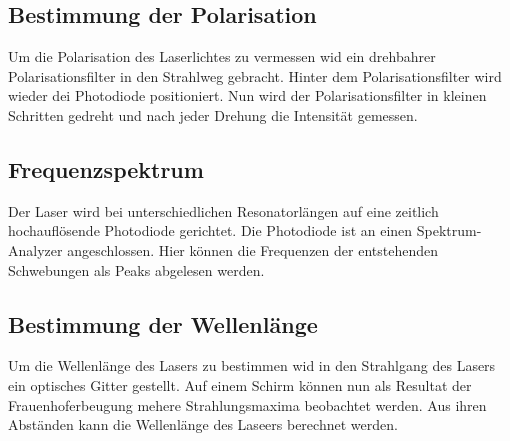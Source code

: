 \subsection{Bestimmung der Polarisation}
\label{sec:polarisation}
Um die Polarisation des Laserlichtes zu vermessen wid ein drehbahrer Polarisationsfilter in den Strahlweg 
gebracht. Hinter dem Polarisationsfilter wird wieder dei Photodiode positioniert. Nun wird der
Polarisationsfilter in kleinen Schritten gedreht und nach jeder Drehung die Intensität gemessen.

\subsection{Frequenzspektrum}
\label{sec:Frequenzspektrum}
Der Laser wird bei unterschiedlichen Resonatorlängen auf eine zeitlich hochauflösende Photodiode gerichtet.
Die Photodiode ist an einen Spektrum-Analyzer angeschlossen. Hier können die Frequenzen der entstehenden 
Schwebungen als Peaks abgelesen werden.

\subsection{Bestimmung der Wellenlänge}
\label{sec:wellenlaenge}
Um die Wellenlänge des Lasers zu bestimmen wid in den Strahlgang des Lasers ein optisches Gitter gestellt.
Auf einem Schirm können nun als Resultat der Frauenhoferbeugung mehere Strahlungsmaxima beobachtet werden.
Aus ihren Abständen kann die Wellenlänge des Laseers berechnet werden.